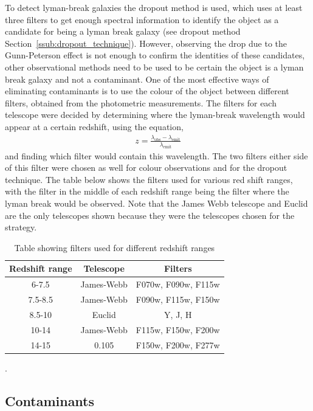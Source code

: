 	To detect lyman-break galaxies the dropout method is used, which uses at least three filters to get enough spectral information to identify the object as a candidate for being a lyman break galaxy (see dropout method Section~\ref{ssub:dropout_technique}). However, observing the drop due to the Gunn-Peterson effect is not enough to confirm the identities of these candidates, other observational methods need to be used to be certain the object is a lyman break galaxy and not a contaminant. One of the most effective ways of eliminating contaminants is to use the colour of the object between different filters, obtained from the photometric measurements. The filters for each telescope were decided by determining where the lyman-break wavelength would appear at a certain redshift, using the equation,
	\begin{align}
		z=\frac{{{\lambda}_\text{obs}}-{{\lambda}_\text{emit}}}{{{\lambda}_\text{emit}}}
	\end{align}
	and finding which filter would contain this wavelength. The two filters either side of this filter were chosen as well for colour observations and for the dropout technique. The table below shows the filters used for various red shift ranges, with the filter in the middle of each redshift range being the filter where the lyman break would be observed. Note that the James Webb telescope and Euclid are the only telescopes shown because they were the telescopes chosen for the strategy.
	\begin{table}[ht]
		\centering
			\begin{tabular}{c|c|c}
				Redshift range &Telescope &Filters   \\
				\hline \hline
				6-7.5	   &James-Webb&  F070w, F090w, F115w \\
				7.5-8.5&James-Webb&  F090w, F115w, F150w \\
				8.5-10 &Euclid&  Y, J, H\\
				10-14  &James-Webb& F115w, F150w, F200w\\
				14-15  &0.105& F150w, F200w, F277w\\
			\end{tabular}
		\caption{Table showing filters used for different redshift ranges}
		\label{tab:colour_filters}
	\end{table}.


    \subsection{Contaminants} %
    \label{sub:Contanimants}
